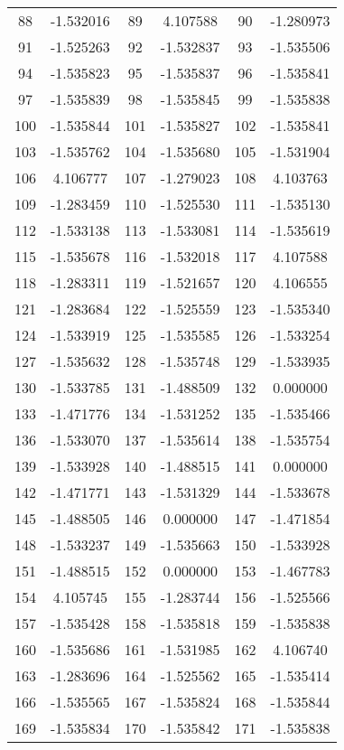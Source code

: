\documentclass[12pt]{article}
\begin{document}
\begin{longtable}{@{}cc|cc|cc@{}}
88 & -1.532016 & 89 & 4.107588 & 90 & -1.280973 \\
91 & -1.525263 & 92 & -1.532837 & 93 & -1.535506 \\
94 & -1.535823 & 95 & -1.535837 & 96 & -1.535841 \\
97 & -1.535839 & 98 & -1.535845 & 99 & -1.535838 \\
100 & -1.535844 & 101 & -1.535827 & 102 & -1.535841 \\
103 & -1.535762 & 104 & -1.535680 & 105 & -1.531904 \\
106 & 4.106777 & 107 & -1.279023 & 108 & 4.103763 \\
109 & -1.283459 & 110 & -1.525530 & 111 & -1.535130 \\
112 & -1.533138 & 113 & -1.533081 & 114 & -1.535619 \\
115 & -1.535678 & 116 & -1.532018 & 117 & 4.107588 \\
118 & -1.283311 & 119 & -1.521657 & 120 & 4.106555 \\
121 & -1.283684 & 122 & -1.525559 & 123 & -1.535340 \\
124 & -1.533919 & 125 & -1.535585 & 126 & -1.533254 \\
127 & -1.535632 & 128 & -1.535748 & 129 & -1.533935 \\
130 & -1.533785 & 131 & -1.488509 & 132 & 0.000000 \\
133 & -1.471776 & 134 & -1.531252 & 135 & -1.535466 \\
136 & -1.533070 & 137 & -1.535614 & 138 & -1.535754 \\
139 & -1.533928 & 140 & -1.488515 & 141 & 0.000000 \\
142 & -1.471771 & 143 & -1.531329 & 144 & -1.533678 \\
145 & -1.488505 & 146 & 0.000000 & 147 & -1.471854 \\
148 & -1.533237 & 149 & -1.535663 & 150 & -1.533928 \\
151 & -1.488515 & 152 & 0.000000 & 153 & -1.467783 \\
154 & 4.105745 & 155 & -1.283744 & 156 & -1.525566 \\
157 & -1.535428 & 158 & -1.535818 & 159 & -1.535838 \\
160 & -1.535686 & 161 & -1.531985 & 162 & 4.106740 \\
163 & -1.283696 & 164 & -1.525562 & 165 & -1.535414 \\
166 & -1.535565 & 167 & -1.535824 & 168 & -1.535844 \\
169 & -1.535834 & 170 & -1.535842 & 171 & -1.535838 \\

\end{longtable}
\end{document}
